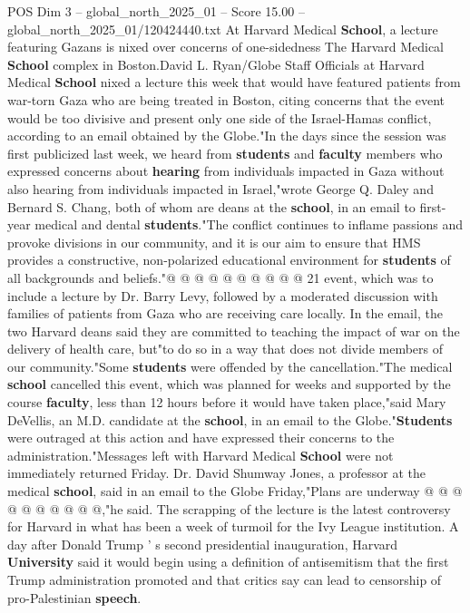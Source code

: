 \begin{textsample}{POS Dim 3 – global\_north\_2025\_01 – Score 15.00 – global\_north\_2025\_01/120424440.txt}  \label{ex:f3_pos_247}
At Harvard Medical \textbf{School}, a lecture featuring Gazans is nixed over concerns of one-sidedness The Harvard Medical \textbf{School} complex in Boston.David L.
Ryan/Globe Staff Officials at Harvard Medical \textbf{School} nixed a lecture this week that would have featured patients from war-torn Gaza who are being treated in Boston, citing concerns that the event would be too divisive and present only one side of the Israel-Hamas conflict, according to an email obtained by the Globe."In the days since the session was first publicized last week, we heard from \textbf{students} and \textbf{faculty} members who expressed concerns about \textbf{hearing} from individuals impacted in Gaza without also hearing from individuals impacted in Israel,"wrote George Q.
Daley and Bernard S.
Chang, both of whom are deans at the \textbf{school}, in an email to first-year medical and dental \textbf{students}."The conflict continues to inflame passions and provoke divisions in our community, and it is our aim to ensure that HMS provides a constructive, non-polarized educational environment for \textbf{students} of all backgrounds and beliefs."@ @ @ @ @ @ @ @ @ @ 21 event, which was to include a lecture by Dr.
Barry Levy, followed by a moderated discussion with families of patients from Gaza who are receiving care locally.
In the email, the two Harvard deans said they are committed to teaching the impact of war on the delivery of health care, but"to do so in a way that does not divide members of our community."Some \textbf{students} were offended by the cancellation."The medical \textbf{school} cancelled this event, which was planned for weeks and supported by the course \textbf{faculty}, less than 12 hours before it would have taken place,"said Mary DeVellis, an M.D. candidate at the \textbf{school}, in an email to the Globe."\textbf{Students} were outraged at this action and have expressed their concerns to the administration."Messages left with Harvard Medical \textbf{School} were not immediately returned Friday.
Dr.
David Shumway Jones, a professor at the medical \textbf{school}, said in an email to the Globe Friday,"Plans are underway @ @ @ @ @ @ @ @ @ @,"he said.
The scrapping of the lecture is the latest controversy for Harvard in what has been a week of turmoil for the Ivy League institution.
A day after Donald Trump ' s second presidential inauguration, Harvard \textbf{University} said it would begin using a definition of antisemitism that the first Trump administration promoted and that critics say can lead to censorship of pro-Palestinian \textbf{speech}.

\end{textsample}
